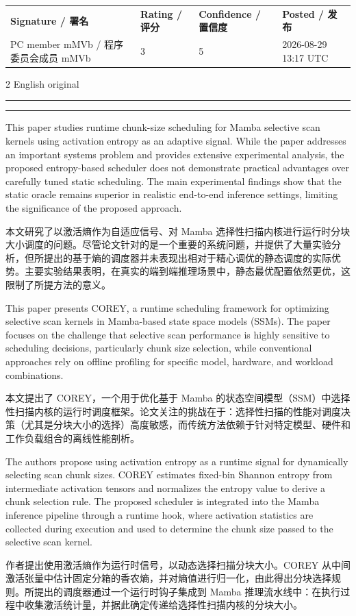 \documentclass[10pt,a4paper]{article}
\makeatletter
\newcommand{\Pair}[2]{#1\par\switchcolumn #2\par\switchcolumn*}
\newcommand{\fieldhead}[1]{{\color{accent}\sffamily\bfseries #1}}
\newcommand{\PairHead}[2]{\Pair{\needspace{5\baselineskip}\fieldhead{#1}}%
                               {\needspace{5\baselineskip}\fieldhead{#2}}}
\newcommand{\colhead}[1]{{\small\sffamily\color{muted}#1}\par\vspace{-0.9em}%
  {\color{black!25}\rule{\linewidth}{0.4pt}}}
\newcommand{\ColHeads}{\Pair{\colhead{English original}}{\colhead{中文译文}}}
\newcommand{\ReviewMeta}[4]{%
  \begin{infobox}
  \begin{tabularx}{\linewidth}{@{}X l l l@{}}
  \textbf{Signature / 署名} & \textbf{Rating / 评分} & \textbf{Confidence / 置信度} & \textbf{Posted / 发布} \\
  #1 & #2 & #3 & #4
  \end{tabularx}
  \end{infobox}}
\makeatother
\begin{document}
\ReviewMeta{PC member mMVb / 程序委员会成员 mMVb}{3}{5}{2026-08-29 13:17 UTC}

\begin{paracol}{2}
\ColHeads

\PairHead{Title}{标题}

\Pair{This paper studies runtime chunk-size scheduling for Mamba selective scan
kernels using activation entropy as an adaptive signal. While the paper addresses an
important systems problem and provides extensive experimental analysis, the proposed
entropy-based scheduler does not demonstrate practical advantages over carefully
tuned static scheduling. The main experimental findings show that the static oracle
remains superior in realistic end-to-end inference settings, limiting the
significance of the proposed approach.}
{本文研究了以激活熵作为自适应信号、对 Mamba 选择性扫描内核进行运行时分块大小调度的问题。尽管论文针对的是一个重要的系统问题，并提供了大量实验分析，但所提出的基于熵的调度器并未表现出相对于精心调优的静态调度的实际优势。主要实验结果表明，在真实的端到端推理场景中，静态最优配置依然更优，这限制了所提方法的意义。}

\PairHead{Review}{审稿意见}

\Pair{This paper presents COREY, a runtime scheduling framework for optimizing
selective scan kernels in Mamba-based state space models (SSMs). The paper focuses
on the challenge that selective scan performance is highly sensitive to scheduling
decisions, particularly chunk size selection, while conventional approaches rely on
offline profiling for specific model, hardware, and workload combinations.}
{本文提出了 COREY，一个用于优化基于 Mamba 的状态空间模型（SSM）中选择性扫描内核的运行时调度框架。论文关注的挑战在于：选择性扫描的性能对调度决策（尤其是分块大小的选择）高度敏感，而传统方法依赖于针对特定模型、硬件和工作负载组合的离线性能剖析。}

\Pair{The authors propose using activation entropy as a runtime signal for
dynamically selecting scan chunk sizes. COREY estimates fixed-bin Shannon entropy
from intermediate activation tensors and normalizes the entropy value to derive a
chunk selection rule. The proposed scheduler is integrated into the Mamba inference
pipeline through a runtime hook, where activation statistics are collected during
execution and used to determine the chunk size passed to the selective scan kernel.}
{作者提出使用激活熵作为运行时信号，以动态选择扫描分块大小。COREY 从中间激活张量中估计固定分箱的香农熵，并对熵值进行归一化，由此得出分块选择规则。所提出的调度器通过一个运行时钩子集成到 Mamba 推理流水线中：在执行过程中收集激活统计量，并据此确定传递给选择性扫描内核的分块大小。}


\end{paracol}
\end{document}
